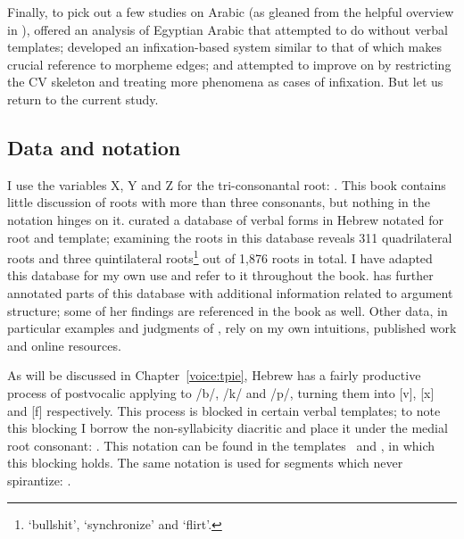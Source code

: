 \begin{exe}
\begin{xlist}
\begin{exe}
\begin{exe}
\begin{exe}
\begin{exe}
\begin{xlist}
\begin{exe}
\begin{xlist}
\begin{xlist}
\begin{xlist}
\begin{exe}
\begin{xlist}
Finally, to pick out a few studies on Arabic (as gleaned from the helpful overview in \citealt{ussishkin00phd}), \cite{darden92} offered an analysis of Egyptian Arabic that attempted to do without verbal templates; \cite{mcomber95} developed an infixation-based system similar to that of \cite{jjmcc81} which makes crucial reference to morpheme edges; and \cite{ratcliffe97,ratcliffe98} attempted to improve on \cite{jjmccprince90} by restricting the CV skeleton and treating more phenomena as cases of infixation. But let us return to the current study.

	\subsection{Data and notation} \label{sec:data:notation}
I use the variables X, Y and Z for the tri-consonantal root: . This book contains little discussion of roots with more than three consonants, but nothing in the notation hinges on it. \cite{ehrenfeld12} curated a database of verbal forms in Hebrew notated for root and template; examining the roots in this database reveals 311 quadrilateral roots and three quintilateral roots\footnote{ `bullshit',  `synchronize' and  `flirt'.} out of 1,876 roots in total. I have adapted this database for my own use and refer to it throughout the book. \cite{ahdout19phd} has further annotated parts of this database with additional information related to argument structure; some of her findings are referenced in the book as well. Other data, in particular examples and judgments of , rely on my own intuitions, published work and online resources.

As will be discussed in Chapter~\ref{voice:tpie}, Hebrew has a fairly productive process of postvocalic  applying to /b/, /k/ and /p/, turning them into [v], [x] and [f] respectively. This process is blocked in certain verbal templates; to note this blocking I borrow the non-syllabicity diacritic and place it under the medial root consonant: . This notation can be found in the templates \tpie~and \thit, in which this blocking holds. The same notation is used for segments which never spirantize: .


\end{xlist}
\end{exe}
\end{xlist}
\end{xlist}
\end{xlist}
\end{exe}
\end{xlist}
\end{exe}
\end{exe}
\end{exe}
\end{exe}
\end{xlist}
\end{exe}
